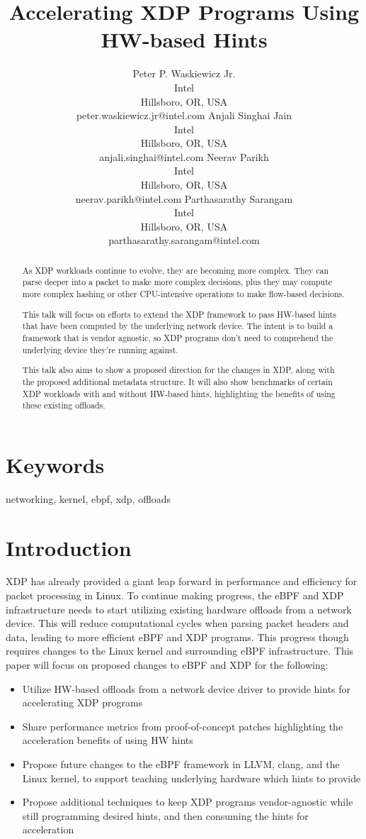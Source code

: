 \documentclass[letterpaper]{article}
\title{Accelerating XDP Programs Using HW-based Hints}
\author{Peter P. Waskiewicz Jr. \\ Intel \\ Hillsboro, OR, USA \\ peter.waskiewicz.jr@intel.com
\And Anjali Singhai Jain \\ Intel \\ Hillsboro, OR, USA \\ anjali.singhai@intel.com
\And Neerav Parikh \\ Intel \\ Hillsboro, OR, USA \\ neerav.parikh@intel.com
\And Parthasarathy Sarangam \\ Intel \\ Hillsboro, OR, USA \\ parthasarathy.sarangam@intel.com
\newline
\newline
}
\begin{document}
 
\maketitle
\begin{abstract}
As XDP workloads continue to evolve, they are becoming more complex.  They can parse deeper into a packet to make more complex decisions, plus they may compute more complex hashing or other CPU-intensive operations to make flow-based decisions.

This talk will focus on efforts to extend the XDP framework to pass HW-based hints that have been computed by the underlying network device.  The intent is to build a framework that is vendor agnostic, so XDP programs don't need to comprehend the underlying device they're running against.

This talk also aims to show a proposed direction for the changes in XDP, along with the proposed additional metadata structure.  It will also show benchmarks of certain XDP workloads with and without HW-based hints, highlighting the benefits of using these existing offloads.
\end{abstract}

\section{Keywords}

networking, kernel, ebpf, xdp, offloads

\section{Introduction}
XDP has already provided a giant leap forward in performance and efficiency for packet processing in Linux. To continue making progress, the eBPF and XDP infrastructure needs to start utilizing existing hardware offloads from a network device. This will reduce computational cycles when parsing packet headers and data, leading to more efficient eBPF and XDP programs. This progress though requires changes to the Linux kernel and surrounding eBPF infrastructure.
\newline
\newline
This paper will focus on proposed changes to eBPF and XDP for the following:
\begin{itemize}
\item Utilize HW-based offloads from a network device driver to provide hints for accelerating XDP programs
\item Share performance metrics from proof-of-concept patches highlighting the acceleration benefits of using HW hints
\item Propose future changes to the eBPF framework in LLVM, clang, and the Linux kernel, to support teaching underlying hardware which hints to provide
\item Propose additional techniques to keep XDP programs vendor-agnostic while still programming desired hints, and then consuming the hints for acceleration
\end{itemize}
\end{document}
